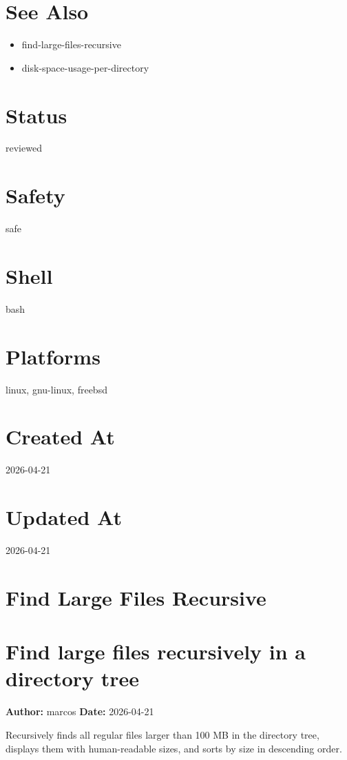 \documentclass[openany]{book}
\begin{document}
\section*{See Also}
\begin{itemize}
  \item find-large-files-recursive
  \item disk-space-usage-per-directory
\end{itemize}

\section*{Status}
reviewed

\section*{Safety}
safe

\section*{Shell}
bash

\section*{Platforms}
linux, gnu-linux, freebsd

\section*{Created At}
2026-04-21

\section*{Updated At}
2026-04-21

\section{Find Large Files Recursive}
\section*{Find large files recursively in a directory tree}
\textbf{Author:} marcos \hfill \textbf{Date:} 2026-04-21

\noindent Recursively finds all regular files larger than 100 MB in the directory tree, displays them with human-readable sizes, and sorts by size in descending order.
\end{document}
